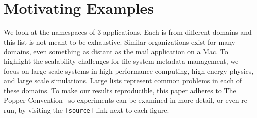 \vspace{-0.5em}
\section{Motivating Examples}
\label{sec:motivating-examples}
\vspace{-0.5em}

We look at the namespaces of 3 applications.  Each is from different domains
and this list is not meant to be exhaustive. Similar organizations exist for
many domains, even something as distant as the mail application on a Mac. To
highlight the scalability challenges for file system metadata management, we
focus on large scale systems in high performance computing, high energy
physics, and large scale simulations. Large lists represent common problems in
each of these domains.  To make our results reproducible, this paper adheres to
The Popper Convention~\cite{jimenez:ipdpsw17-popper} so experiments can be
examined in more detail, or even re-run, by visiting the \texttt{[source]} link
next to each figure. 

